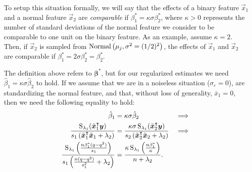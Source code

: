 To setup this situation formally, we will say that the effects of a binary feature
\(\vec{x}_1\) and a normal feature \(\vec{x}_2\) are \emph{comparable} if \(\beta^*_1 =
\kappa \sigma \beta^*_2\), where \(\kappa > 0\) represents the number of standard
deviations of the normal feature we consider to be comparable to one unit on the binary
feature. As an example, assume \(\kappa = 2\). Then, if \(\vec{x}_2\) is sampled from
\(\operatorname{Normal}\left(\mu_j, \sigma^2 = (1/2)^2\right)\), the effects of \(\vec{x}_1\) and
\(\vec{x}_2\) are comparable if \(\beta_1^* = 2\sigma \beta_2^* = \beta_2^*\).


The definition above refers to \(\bm{\beta}^*\), but for our regularized estimates we need
\(\hat{\beta}_1 = \kappa\sigma\hat{\beta}_2\) to hold. If we assume that we are in a
noiseless situation (\(\sigma_\varepsilon = 0\)), are standardizing the normal feature, and
that, without loss of generality, \(\bar{x}_1 = 0\), then we need the following equality to
hold:
%
\begin{align}
  \label{eq:comparable-effects}
  \hat{\beta}_1                                                                                                                          & = \kappa\sigma \hat{\beta}_2                                                                                                                         & \implies \nonumber \\
  \frac{\operatorname{S}_{\lambda_1}(\tilde{\bm{x}}_1^\intercal \bm{y})}{s_1\left(\tilde{\bm{x}}_1^\intercal \tilde{\bm{x}}_1 + \lambda_2\right)} & =\frac{\kappa\sigma \operatorname{S}_{\lambda_1}(\tilde{\bm{x}}_2^\intercal \bm{y})}{s_2\left(\tilde{\bm{x}}_2^\intercal \tilde{\bm{x}}_2 + \lambda_2\right)} & \implies \nonumber \\
  \frac{\operatorname{S}_{\lambda_1}\left(\frac{n\beta_1^* (q - q^2)}{s_1}\right)}{s_1\left(\frac{n(q - q^2)}{s_1^2} + \lambda_2\right)}              & =  \frac{\kappa \operatorname{S}_{\lambda_1}\left(\frac{n\beta_1^*}{\kappa} \right)}{n + \lambda_2}.                                                              &
\end{align}

